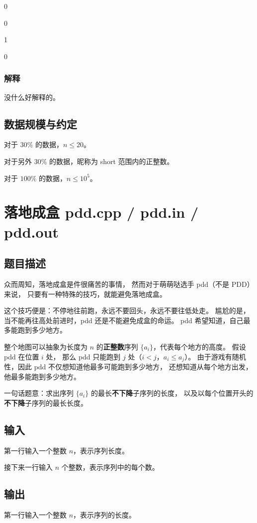 \documentclass[UTF8]{article}
\begin{document}
	0

	0

	1

	0

	\subsubsection{解释}
	没什么好解释的。

	\subsection{数据规模与约定}
	对于 $30\%$ 的数据，$n \le 20$。

	对于另外 $30\%$ 的数据，昵称为 short 范围内的正整数。

	对于 $100\%$ 的数据，$n \le 10^5$。

	\newpage
	\section{落地成盒 \small{pdd.cpp / pdd.in / pdd.out}}
	\subsection{题目描述}
	众而周知，落地成盒是件很痛苦的事情，
	然而对于萌萌哒选手 pdd（不是 PDD）来说，
	只要有一种特殊的技巧，就能避免落地成盒。

	这个技巧便是：不停地往前跑，永远不要回头，永远不要往低处走。
	尴尬的是，当不能再往高处前进时，pdd 还是不能避免成盒的命运。
	pdd 希望知道，自己最多能跑到多少地方。

	\bigskip
	整个地图可以抽象为长度为 $n$ 的\textbf{正整数}序列 $\{ a_i \}$，代表每个地方的高度。
	假设 pdd 在位置 $i$ 处，
	那么 pdd 只能跑到 $j$ 处（$i < j$，$a_i \le a_j$）。
	由于游戏有随机性，因此 pdd 不仅想知道他最多可能跑到多少地方，
	还想知道从每个地方出发，他最多能跑到多少地方。

	\begin{small}
		一句话题意：求出序列 $\{ a_i \}$ 的最长\textbf{不下降}子序列的长度，
		以及以每个位置开头的\textbf{不下降}子序列的最长长度。
	\end{small}

	\subsection{输入}
	第一行输入一个整数 $n$，表示序列长度。

	接下来一行输入 $n$ 个整数，表示序列中的每个数。 

	\subsection{输出}
	第一行输入一个整数 $n$，表示序列的长度。
\end{document}
